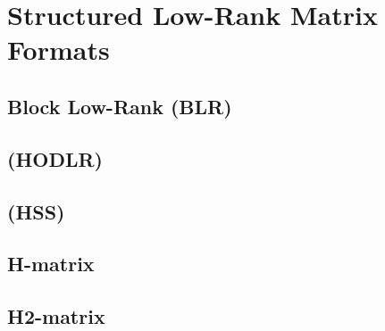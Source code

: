 \section{Structured Low-Rank Matrix Formats}
\label{sec:matrix_formats}

\subsection{Block Low-Rank (BLR)}
\label{sec:blr}

\subsection{(HODLR)}
\label{sec:hodlr}

\subsection{ (HSS)}
\label{sec:hss}

\subsection{H-matrix}
\label{sec:h_matrix}

\subsection{H2-matrix}
\label{sec:h2_matrix}